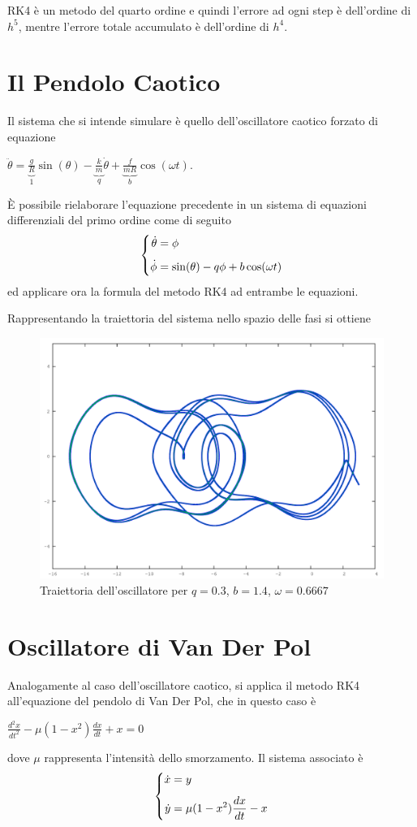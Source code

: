 \documentclass[a4paper,11pt]{report}
\newenvironment{system}{\left\lbrace \begin{aligned}}{\end{aligned}\right.}
\begin{document}
RK4 è un metodo del quarto ordine e quindi l'errore ad ogni step è dell'ordine di $h^5$, mentre l'errore totale accumulato è dell'ordine di $h^4$.

\section{Il Pendolo Caotico}
Il sistema che si intende simulare è quello dell'oscillatore caotico forzato di equazione
\begin{center}
$\ddot{\theta} = \underbrace{\frac{g}{R}}_1 \sin(\theta)-\underbrace{\frac{k}{m}}_q \dot{\theta}+\underbrace{\frac{f}{mR}}_b \cos(\omega t)$.
\end{center}
È possibile rielaborare l'equazione precedente in un sistema di equazioni differenziali del primo ordine come di seguito
$$\begin{system}
\dot\theta&=\phi \\[1ex] \dot\phi&=\sin(\theta)-q\phi+b\cos(\omega t)
\end{system}$$
ed applicare ora la formula del metodo RK4 ad entrambe le equazioni.

Rappresentando la traiettoria del sistema nello spazio delle fasi si ottiene
\begin{figure}[h!]
\centering
\includegraphics[width=\textwidth]{chaotic}
\caption{Traiettoria dell'oscillatore per $q = 0.3$, $b = 1.4$, $\omega = 0.6667$}
\label{fig:chaotic}
\end{figure}

\section{Oscillatore di Van Der Pol}
Analogamente al caso dell'oscillatore caotico, si applica il metodo RK4 all'equazione del pendolo di Van Der Pol, che in questo caso è
\begin{center}
$\frac{d^2x}{dt^2}-\mu(1-x^2)\frac{dx}{dt}+x= 0$
\end{center}
dove $\mu$ rappresenta l'intensità dello smorzamento. Il sistema associato è
$$\begin{system}
\dot x&= y\\[1ex] \dot y&=\mu(1-x^2)\frac{dx}{dt}-x
\end{system}$$
\end{document}
